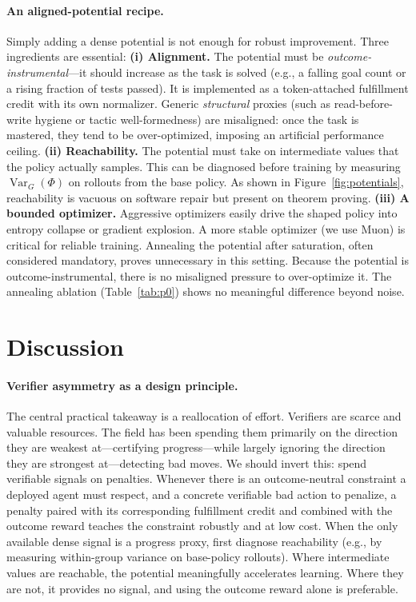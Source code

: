 \paragraph{An aligned-potential recipe.} Simply adding a dense potential is not enough for robust improvement. Three ingredients are essential: \textbf{(i) Alignment.} The potential must be \emph{outcome-instrumental}---it should increase as the task is solved (e.g., a falling goal count or a rising fraction of tests passed). It is implemented as a token-attached fulfillment credit with its own normalizer. Generic \emph{structural} proxies (such as read-before-write hygiene or tactic well-formedness) are misaligned: once the task is mastered, they tend to be over-optimized, imposing an artificial performance ceiling. \textbf{(ii) Reachability.} The potential must take on intermediate values that the policy actually samples. This can be diagnosed before training by measuring $\operatorname{Var}_G(\Phi)$ on rollouts from the base policy. As shown in Figure~\ref{fig:potentials}, reachability is vacuous on software repair but present on theorem proving. \textbf{(iii) A bounded optimizer.} Aggressive optimizers easily drive the shaped policy into entropy collapse or gradient explosion. A more stable optimizer (we use Muon) is critical for reliable training. Annealing the potential after saturation, often considered mandatory, proves unnecessary in this setting. Because the potential is outcome-instrumental, there is no misaligned pressure to over-optimize it. The annealing ablation (Table~\ref{tab:p0}) shows no meaningful difference beyond noise.

\section{Discussion}

\paragraph{Verifier asymmetry as a design principle.} The central practical takeaway is a reallocation of effort. Verifiers are scarce and valuable resources. The field has been spending them primarily on the direction they are weakest at---certifying progress---while largely ignoring the direction they are strongest at---detecting bad moves. We should invert this: spend verifiable signals on penalties. Whenever there is an outcome-neutral constraint a deployed agent must respect, and a concrete verifiable bad action to penalize, a penalty paired with its corresponding fulfillment credit and combined with the outcome reward teaches the constraint robustly and at low cost. When the only available dense signal is a progress proxy, first diagnose reachability (e.g., by measuring within-group variance on base-policy rollouts). Where intermediate values are reachable, the potential meaningfully accelerates learning. Where they are not, it provides no signal, and using the outcome reward alone is preferable.

